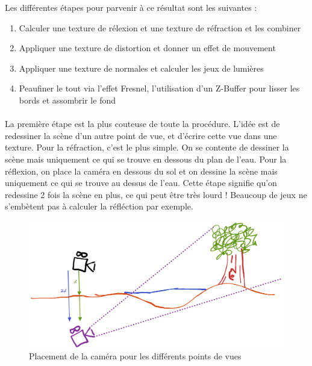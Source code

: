 \documentclass{EPUProjetDi}
\begin{document}
Les différentes étapes pour parvenir à ce résultat sont les suivantes :


\begin{enumerate}
\item Calculer une texture de rélexion et une texture de réfraction et les combiner
\item Appliquer une texture de distortion et donner un effet de mouvement
\item Appliquer une texture de normales et calculer les jeux de lumières
\item Peaufiner le tout via l'effet Fresnel, l'utilisation d'un Z-Buffer pour lisser les bords et assombrir le fond
\end{enumerate}

\paragraph{}
La première étape est la plus couteuse de toute la procédure. L'idée est de redessiner la scène d'un autre point de vue, et d'écrire cette vue dans une texture.
Pour la réfraction, c'est le plus simple. On se contente de dessiner la scène mais uniquement ce qui se trouve en dessous du plan de l'eau.
Pour la réflexion, on place la caméra en dessous du sol et on dessine la scène mais uniquement ce qui se trouve au dessus de l'eau.
Cette étape signifie qu'on redessine 2 fois la scène en plus, ce qui peut être très lourd ! Beaucoup de jeux ne s'embètent pas à calculer la réfléction par exemple.

\begin{figure}[h]
	\centering
	\includegraphics[scale=.3]{water_camera}
	\caption{Placement de la caméra pour les différents points de vues}
	\label{fig:water_camera}
\end{figure}
\end{document}
